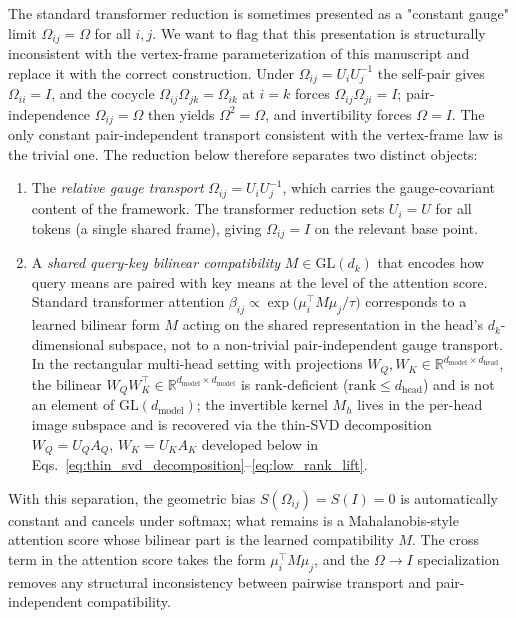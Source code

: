 \documentclass[11pt]{article}
\begin{document}
The standard transformer reduction is sometimes presented as a "constant gauge" limit $\Omega_{ij} = \Omega$ for all $i,j$. We want to flag that this presentation is structurally inconsistent with the vertex-frame parameterization of this manuscript and replace it with the correct construction. Under $\Omega_{ij} = U_iU_j^{-1}$ the self-pair gives $\Omega_{ii} = I$, and the cocycle $\Omega_{ij}\Omega_{jk} = \Omega_{ik}$ at $i = k$ forces $\Omega_{ij}\Omega_{ji} = I$; pair-independence $\Omega_{ij} = \Omega$ then yields $\Omega^2 = \Omega$, and invertibility forces $\Omega = I$. The only constant pair-independent transport consistent with the vertex-frame law is the trivial one. The reduction below therefore separates two distinct objects:
\begin{enumerate}
\item The \emph{relative gauge transport} $\Omega_{ij} = U_iU_j^{-1}$, which carries the gauge-covariant content of the framework. The transformer reduction sets $U_i = U$ for all tokens (a single shared frame), giving $\Omega_{ij} = I$ on the relevant base point.
\item A \emph{shared query-key bilinear compatibility} $M \in \mathrm{GL}(d_k)$ that encodes how query means are paired with key means at the level of the attention score. Standard transformer attention $\beta_{ij} \propto \exp\big(\mu_i^\top M \mu_j / \tau\big)$ corresponds to a learned bilinear form $M$ acting on the shared representation in the head's $d_k$-dimensional subspace, not to a non-trivial pair-independent gauge transport. In the rectangular multi-head setting with projections $W_Q, W_K \in \mathbb{R}^{d_{\text{model}} \times d_{\text{head}}}$, the bilinear $W_Q W_K^\top \in \mathbb{R}^{d_{\text{model}}\times d_{\text{model}}}$ is rank-deficient ($\mathrm{rank} \le d_{\text{head}}$) and is not an element of $\mathrm{GL}(d_{\text{model}})$; the invertible kernel $M_h$ lives in the per-head image subspace and is recovered via the thin-SVD decomposition $W_Q = U_Q A_Q$, $W_K = U_K A_K$ developed below in Eqs.~\eqref{eq:thin_svd_decomposition}--\eqref{eq:low_rank_lift}.
\end{enumerate}
With this separation, the geometric bias $S(\Omega_{ij}) = S(I) = 0$ is automatically constant and cancels under softmax; what remains is a Mahalanobis-style attention score whose bilinear part is the learned compatibility $M$. The cross term in the attention score takes the form $\mu_i^\top M \mu_j$, and the $\Omega \to I$ specialization removes any structural inconsistency between pairwise transport and pair-independent compatibility.
\end{document}
